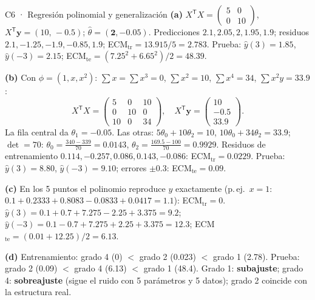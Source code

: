 \begin{solucion}{C6 · Regresión polinomial y generalización}
\textbf{(a)} $X^\mathsf TX=\begin{pmatrix}5&0\\0&10\end{pmatrix}$, $X^\mathsf T\mathbf y=(10,\,-0.5)$; $\hat\theta=(\mathbf{2},\mathbf{-0.05})$.
Predicciones $2.1,2.05,2,1.95,1.9$; residuos $2.1,-1.25,-1.9,-0.85,1.9$; ECM$_{\text{tr}}=13.915/5=\mathbf{2.783}$.
Prueba: $\hat y(3)=1.85$, $\hat y(-3)=2.15$; ECM$_{\text{te}}=(7.25^2+6.65^2)/2=\mathbf{48.39}$.

\textbf{(b)} Con $\phi=(1,x,x^2)$: $\sum x=\sum x^3=0$, $\sum x^2=10$, $\sum x^4=34$, $\sum x^2y=33.9$:
\[X^\mathsf TX=\begin{pmatrix}5&0&10\\0&10&0\\10&0&34\end{pmatrix},\quad X^\mathsf T\mathbf y=\begin{pmatrix}10\\-0.5\\33.9\end{pmatrix}.\]
La fila central da $\theta_1=-0.05$. Las otras: $5\theta_0+10\theta_2=10$, $10\theta_0+34\theta_2=33.9$; $\det=70$:
$\theta_0=\frac{340-339}{70}=\mathbf{0.0143}$, $\theta_2=\frac{169.5-100}{70}=\mathbf{0.9929}$.
Residuos de entrenamiento $0.114,-0.257,0.086,0.143,-0.086$: ECM$_{\text{tr}}=\mathbf{0.0229}$.
Prueba: $\hat y(3)=8.80$, $\hat y(-3)=9.10$; errores $\pm0.3$: ECM$_{\text{te}}=\mathbf{0.09}$.

\textbf{(c)} En los 5 puntos el polinomio reproduce $y$ exactamente (p.\,ej.\ $x=1$: $0.1+0.2333+0.8083-0.0833+0.0417=1.1$): ECM$_{\text{tr}}=0$.
$\hat y(3)=0.1+0.7+7.275-2.25+3.375=9.2$; $\hat y(-3)=0.1-0.7+7.275+2.25+3.375=12.3$; ECM$_{\text{te}}=(0.01+12.25)/2=\mathbf{6.13}$.

\textbf{(d)} Entrenamiento: grado 4 (0) $<$ grado 2 (0.023) $<$ grado 1 (2.78). Prueba: grado 2 (0.09) $<$ grado 4 (6.13) $<$ grado 1 (48.4).
Grado 1: \textbf{subajuste}; grado 4: \textbf{sobreajuste} (sigue el ruido con 5 parámetros y 5 datos); grado 2 coincide con la estructura real.
\end{solucion}

